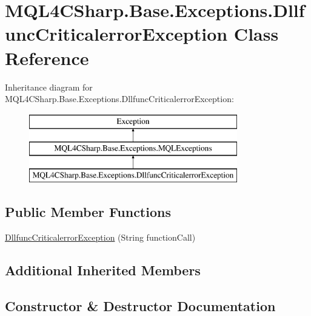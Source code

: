 \hypertarget{class_m_q_l4_c_sharp_1_1_base_1_1_exceptions_1_1_dllfunc_criticalerror_exception}{}\section{M\+Q\+L4\+C\+Sharp.\+Base.\+Exceptions.\+Dllfunc\+Criticalerror\+Exception Class Reference}
\label{class_m_q_l4_c_sharp_1_1_base_1_1_exceptions_1_1_dllfunc_criticalerror_exception}
Inheritance diagram for M\+Q\+L4\+C\+Sharp.\+Base.\+Exceptions.\+Dllfunc\+Criticalerror\+Exception\+:\begin{figure}[H]
\begin{center}
\leavevmode
\includegraphics[height=3.000000cm]{class_m_q_l4_c_sharp_1_1_base_1_1_exceptions_1_1_dllfunc_criticalerror_exception}
\end{center}
\end{figure}
\subsection*{Public Member Functions}
\begin{DoxyCompactItemize}
\item 
\hyperlink{class_m_q_l4_c_sharp_1_1_base_1_1_exceptions_1_1_dllfunc_criticalerror_exception_aa71adc4e7fb1140c5258d50b8681b845}{Dllfunc\+Criticalerror\+Exception} (String function\+Call)
\end{DoxyCompactItemize}
\subsection*{Additional Inherited Members}


\subsection{Constructor \& Destructor Documentation}
